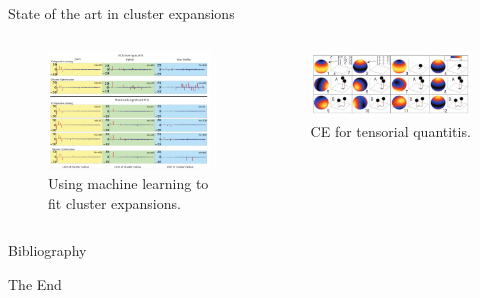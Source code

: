 \documentclass[aspectratio=169]{beamer}
\begin{document}
\begin{frame}{State of the art in cluster expansions}

\begin{columns}
\begin{figure}
    \centering
    \includegraphics[width=\linewidth]{lectures/figures/10_compressive_sensing.png}
    \caption{Using machine learning to fit cluster expansions.\cite{nelsonCompressiveSensingParadigm2013}}
\end{figure} 
\begin{figure}
    \centering
    \includegraphics[width=\linewidth]{lectures/figures/10_tensorial_CE.png}
    \caption{CE for tensorial quantitis.\cite{vandewalleCompleteRepresentationStructureproperty2008}}
\end{figure} 
\end{columns} 

\end{frame} 

    \begin{frame}[allowframebreaks]{Bibliography}
        
        
    \end{frame}



    \begin{frame}
        \Huge{\centerline{The End}}
    \end{frame}
\end{document}
